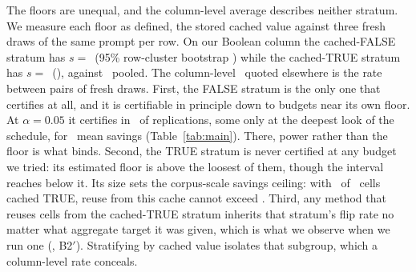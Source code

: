 The floors are unequal, and the column-level average describes
neither stratum. We measure each floor as defined, the stored cached
value against three fresh draws of the same prompt per row. On our
Boolean column the
cached-FALSE stratum has $s{=}$\floorFalseStratum\ (95\% row-cluster
bootstrap \floorFalseCi) while the cached-TRUE stratum has
$s{=}$\floorTrueStratum\ (\floorTrueCi), against \floorIdentityPooled\
pooled. The column-level
\floorBool\ quoted elsewhere is the rate between pairs of fresh draws.
First, the
FALSE stratum is the only one that certifies at all, and it is certifiable in
principle down to budgets near its own floor. At $\alpha{=}0.05$ it
certifies in \edgeCertRate\ of replications, some only at the deepest
look of the schedule, for \edgeSavingsMean\ mean savings
(Table~\ref{tab:main}).
There, power rather than the floor is what binds. Second, the TRUE
stratum is never certified at any budget we tried: its estimated floor is above
the loosest of them, though the interval reaches below it. Its size
sets the corpus-scale savings
ceiling: with \deployTrueStratum\ of \deployN\ cells cached TRUE, reuse
from this cache cannot exceed \deployCeiling. Third, any method that reuses cells from
the cached-TRUE stratum inherits that stratum's flip rate no matter what
aggregate target it
was given, which is what we observe when we run one
(, B2$'$). Stratifying by cached value
isolates that subgroup, which a column-level rate conceals.

